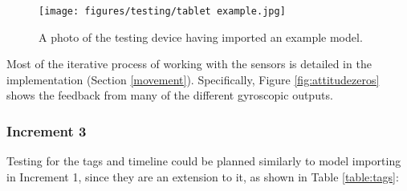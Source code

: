 \documentclass[12pt, a4paper]{article}
\begin{document}
\begin{figure}[]
    \centering
    \texttt{[image: figures/testing/tablet example.jpg]}
        \caption{A photo of the testing device having imported an example model.}
        \label{fig:testingontablet}
\end{figure}

Most of the iterative process of working with the sensors is detailed in the implementation (Section \ref{movement}). Specifically, Figure \ref{fig:attitudezeros} shows the feedback from many of the different gyroscopic outputs.

\subsubsection{Increment 3}
Testing for the tags and timeline could be planned similarly to model importing in Increment 1, since they are an extension to it, as shown in Table \ref{table:tags}:
\end{document}

